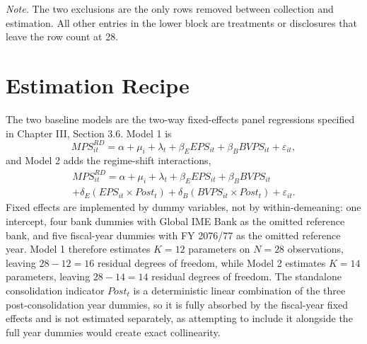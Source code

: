 \begin{table}[!htbp]
\vspace{4pt}
\begin{minipage}{\linewidth}
\footnotesize
\textit{Note.} The two exclusions are the only rows removed between collection and estimation. All other entries in the lower block are treatments or disclosures that leave the row count at 28.
\end{minipage}
\end{table}

\section{Estimation Recipe}

The two baseline models are the two-way fixed-effects panel regressions specified in Chapter III, Section 3.6. Model 1 is
\begin{equation}
\mathit{MPS}^{RD}_{it} = \alpha + \mu_i + \lambda_t + \beta_E \mathit{EPS}_{it} + \beta_B \mathit{BVPS}_{it} + \varepsilon_{it},
\end{equation}
and Model 2 adds the regime-shift interactions,
\begin{equation}
\begin{split}
\mathit{MPS}^{RD}_{it} = \alpha + \mu_i + \lambda_t + \beta_E \mathit{EPS}_{it} + \beta_B \mathit{BVPS}_{it} \\
+ \delta_E (\mathit{EPS}_{it} \times \mathit{Post}_t) + \delta_B (\mathit{BVPS}_{it} \times \mathit{Post}_t) + \varepsilon_{it}.
\end{split}
\end{equation}
Fixed effects are implemented by dummy variables, not by within-demeaning: one intercept, four bank dummies with Global IME Bank as the omitted reference bank, and five fiscal-year dummies with FY 2076/77 as the omitted reference year. Model 1 therefore estimates $K = 12$ parameters on $N = 28$ observations, leaving $28 - 12 = 16$ residual degrees of freedom, while Model 2 estimates $K = 14$ parameters, leaving $28 - 14 = 14$ residual degrees of freedom. The standalone consolidation indicator $\mathit{Post}_t$ is a deterministic linear combination of the three post-consolidation year dummies, so it is fully absorbed by the fiscal-year fixed effects and is not estimated separately, as attempting to include it alongside the full year dummies would create exact collinearity.

